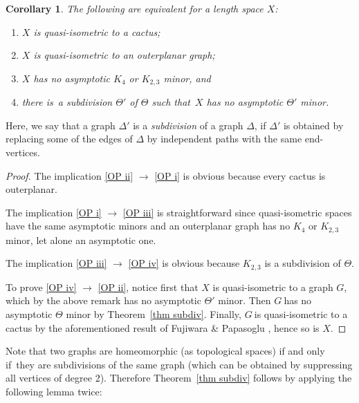 \documentclass[a4paper]{article}
\newcommand{\defi}[1]{{\color{darkgray}\emph{#1}}}
\newtheorem{corollary}[proposition]{Corollary}
\newcommand{\g}{\ensuremath{G\ }}
\newcommand{\G}{\ensuremath{G}}
\newcommand{\Tr}[1]{Theorem~\ref{#1}}
\renewcommand{\iff}{if and only if}
\newcommand{\st}{such that}
\newcommand{\ti}{there is}
\begin{document}
\begin{corollary} \label{cor OP}
The following are equivalent for a length space $X$:
\begin{enumerate}
         \item \label{OP ii} $X$ is quasi-isometric to a cactus; 
         \item \label{OP i} $X$ is quasi-isometric to an outerplanar graph;
      \item \label{OP iii} $X$ has no asymptotic $K_4$ or  $K_{2,3}$ minor, and
      \item \label{OP iv} \ti\ a subdivision $\Theta'$ of $\Theta$ \st\ $X$ has no asymptotic $\Theta'$ minor.
\end{enumerate}
\end{corollary}
Here, we say that a graph $\Delta'$ is a \defi{subdivision} of a graph $\Delta$, if $\Delta'$ is obtained by replacing some of the edges of $\Delta$ by independent paths with the same end-vertices.

\begin{proof}
The implication \ref{OP ii} $\to$ \ref{OP i} is obvious because every cactus is outerplanar.

The implication \ref{OP i} $\to$ \ref{OP iii} is straightforward since quasi-isometric spaces have the same asymptotic minors and an outerplanar graph has no $K_4$ or  $K_{2,3}$ minor, let alone an asymptotic one. 

The implication \ref{OP iii} $\to$ \ref{OP iv} is obvious because $K_{2,3}$ is a subdivision of $\Theta$.

To prove \ref{OP iv} $\to$ \ref{OP ii}, notice first that $X$ is quasi-isometric to a graph \G, which by the above remark has no asymptotic $\Theta'$ minor. Then \g has no asymptotic $\Theta$ minor by \Tr{thm subdiv}. Finally, \g is quasi-isometric to a cactus by the aforementioned result of Fujiwara \& Papasoglu \cite{FujPapCoa}, hence so is $X$.
\end{proof}



Note that two graphs are homeomorphic (as topological spaces) \iff\ they are subdivisions of the same graph (which can be obtained by suppressing all vertices of degree 2). Therefore \Tr{thm subdiv} follows by applying the following lemma twice:
\end{document}
